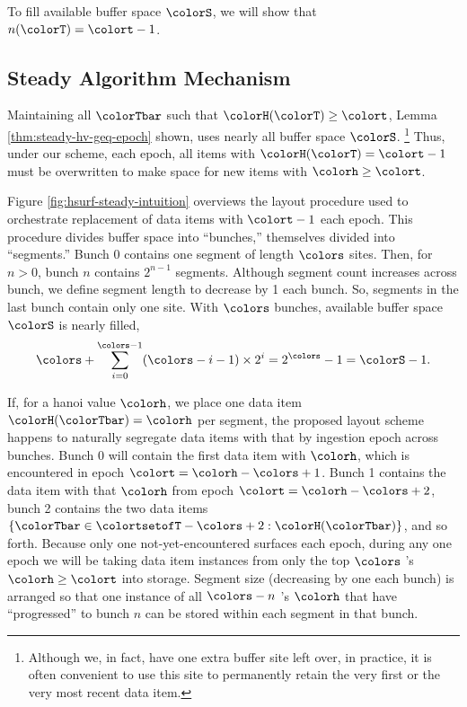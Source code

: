 To fill available buffer space $\colorS$, we will show that $n(\colorT) = \colort - 1$.



\subsection{Steady Algorithm Mechanism}
\label{sec:steady-mechanism}



Maintaining all $\colorTbar$ such that $\colorH(\colorT) \geq \colort$, Lemma \ref{thm:steady-hv-geq-epoch} shown, uses nearly all buffer space $\colorS$.%
\footnote{%
Although we, in fact, have one extra buffer site left over, in practice, it is often convenient to use this site to permanently retain the very first or the very most recent data item.%
}
Thus, under our scheme, each epoch, all items with $\colorH(\colorT) = \colort - 1$ must be overwritten to make space for new items with \hv{} $\colorh \geq \colort$.

Figure \ref{fig:hsurf-steady-intuition} overviews the layout procedure used to orchestrate replacement of data items with \hv{} $\colort - 1$ each epoch.
This procedure divides buffer space into ``bunches,'' themselves divided into ``segments.''
Bunch 0 contains one segment of length $\colors$ sites.
Then, for $n > 0$, bunch $n$ contains $2^{n-1}$ segments.
Although segment count increases across bunch, we define segment length to decrease by 1 each bunch.
So, segments in the last bunch contain only one site.
With $\colors$ bunches, available buffer space $\colorS$ is nearly filled,
\begin{align*}
\colors + \sum_{i=0}^{\colors-1} (\colors - i - 1) \times 2^{i} = 2^{\colors} - 1 = \colorS - 1.
\end{align*}

If, for a hanoi value $\colorh$, we place one data item $\colorH(\colorTbar) = \colorh$ per segment, the proposed layout scheme happens to naturally segregate data items with that \hv{} by ingestion epoch across bunches.
Bunch 0 will contain the first data item with \hv{} $\colorh$, which is encountered in epoch $\colort=\colorh - \colors + 1$.
Bunch 1 contains the data item with that \hv{} $\colorh$ from epoch $\colort=\colorh - \colors + 2$, bunch 2 contains the two data items $\{ \colorTbar \in \colortsetofT - \colors + 2 : \colorH(\colorTbar) \}$, and so forth.
Because only one not-yet-encountered \hv{} surfaces each epoch, during any one epoch we will be taking data item instances from only the top $\colors$ \hv{}'s $\colorh \geq \colort$ into storage.
Segment size (decreasing by one each bunch) is arranged so that one instance of all $\colors - n$ \hv{}'s $\colorh$ that have ``progressed'' to bunch $n$ can be stored within each segment in that bunch.

